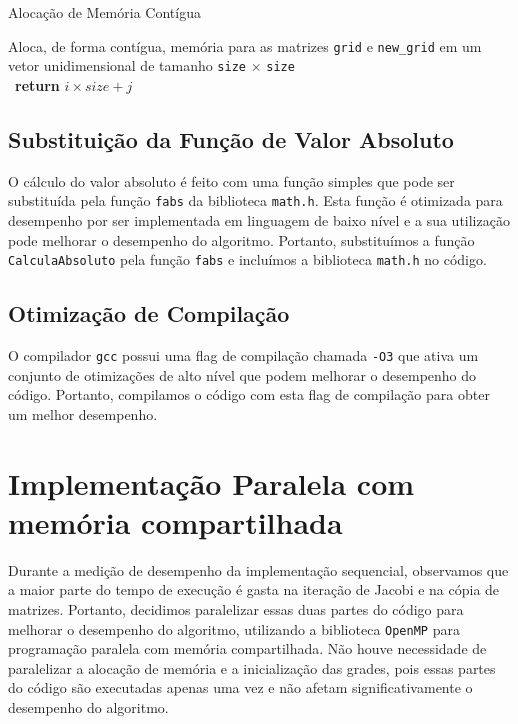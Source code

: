 \documentclass[conference]{IEEEtran}
\begin{document}
\begin{algorithm}[H]
    \caption{Alocação de Memória Contígua}
    \begin{algorithmic}[1]
        \State Aloca, de forma contígua, memória para as matrizes \texttt{grid} e \texttt{new\_grid} em um vetor unidimensional de tamanho \texttt{size} \(\times\) \texttt{size}
        \EndFunction
        \\
        \
        \State \textbf{return} $i \times size + j$
        \EndFunction
    \end{algorithmic}
\end{algorithm}


\subsection{Substituição da Função de Valor Absoluto}

O cálculo do valor absoluto é feito com uma função simples que pode ser substituída pela função \texttt{fabs} da biblioteca \texttt{math.h}. Esta função é otimizada para desempenho por ser implementada em linguagem de baixo nível e a sua utilização pode melhorar o desempenho do algoritmo. Portanto, substituímos a função \texttt{CalculaAbsoluto} pela função \texttt{fabs} e incluímos a biblioteca \texttt{math.h} no código.

\subsection{Otimização de Compilação}

O compilador \texttt{gcc} possui uma flag de compilação chamada \texttt{-O3} que ativa um conjunto de otimizações de alto nível que podem melhorar o desempenho do código. Portanto, compilamos o código com esta flag de compilação para obter um melhor desempenho.


\section{Implementação Paralela com memória compartilhada}

Durante a medição de desempenho da implementação sequencial, observamos que a maior parte do tempo de execução é gasta na iteração de Jacobi e na cópia de matrizes. Portanto, decidimos paralelizar essas duas partes do código para melhorar o desempenho do algoritmo, utilizando a biblioteca \texttt{OpenMP} para programação paralela com memória compartilhada. Não houve necessidade de paralelizar a alocação de memória e a inicialização das grades, pois essas partes do código são executadas apenas uma vez e não afetam significativamente o desempenho do algoritmo.
\end{document}
